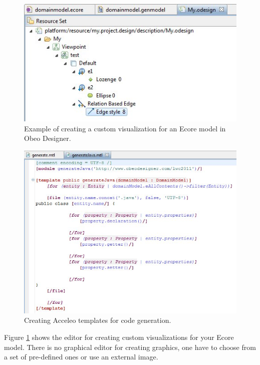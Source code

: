 \begin{figure}[hp]
  \centering
  \centerline{\includegraphics[scale=0.8]{images/obeo_graph_example.jpeg}}
  \caption[Creating graphs in Obeo Designer]{Example of creating a custom visualization for an Ecore model in Obeo Designer.}
  \label{fig:obeo_graphvisual}
\end{figure}

\begin{figure}[hp]
  \centering
  \centerline{\includegraphics[scale=0.7]{images/obeo_generate_code.jpeg}}
  \caption[Creating templates using Acceleo]{Creating Acceleo templates for code generation.}
  \label{fig:obeo_code}
\end{figure}

Figure \ref{fig:obeo_graphvisual} shows the editor for creating custom visualizations for your Ecore model. There is no graphical editor for creating graphics, one have to choose from a set of pre-defined ones or use an external image. 

